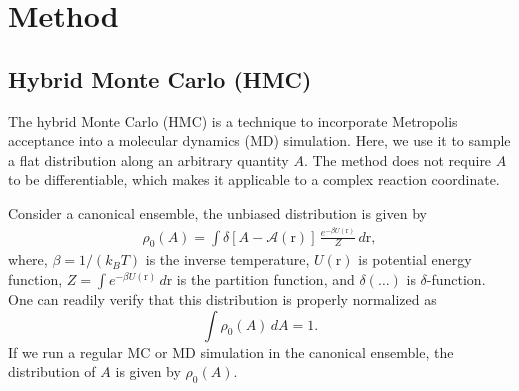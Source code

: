 \documentclass[notitlepage, preprint,superscriptaddress]{revtex4-1}
\begin{document}
\newcommand{\vct}[1]{\bm{\mathrm{#1}}}
\newcommand{\vx}{\vct{x}}
\newcommand{\vy}{\vct{y}}
\newcommand{\Z}{\mathcal{Z}}
\newcommand{\E}{\mathcal{E}}
\newcommand{\Ham}{\mathcal{H}}
\newcommand{\W}{\mathcal{W}}
\newcommand{\A}{\mathcal{A}}

\newcommand{\repl}[2]{{\color{gray} [#1] }{\color{blue} #2}}
\newcommand{\add}[1]{{\color{blue} #1}}
\newcommand{\del}[1]{{\color{gray} [#1]}}
\newcommand{\note}[1]{{\color{OliveGreen}\small [\textbf{Comment.} #1]}}

\newcommand{\hl}[1]{{\color{red} #1}}



\section{Method}

\subsection{Hybrid Monte Carlo (HMC)}



The hybrid Monte Carlo (HMC)
is a technique to incorporate Metropolis acceptance
into a molecular dynamics (MD) simulation.
%
Here, we use it to sample a flat distribution
along an arbitrary quantity $A$.
%
The method
does not require $A$ to be differentiable,
which makes it applicable to
a complex reaction coordinate.

Consider a canonical ensemble,
the unbiased distribution
is given by
\begin{align}
  \rho_0(A)
=
  \int
    \delta[A - \mathcal A(\vct{r})]
    \, \frac{ e^{-\beta U(\vct{r})} } { Z } \, d\vct{r},
\end{align}
where,
$\beta = 1/(k_B T)$ is the inverse temperature,
$U(\vct{r})$ is potential energy function,
$Z = \int e^{-\beta U(\vct{r})} \, d\vct{r}$ is the partition function,
and $\delta(\dots)$ is $\delta$-function.
%
One can readily verify that this distribution is properly normalized as
\[
  \int \rho_0(A) \, dA = 1.
\]
%
If we run a regular MC or MD simulation in the canonical ensemble,
the distribution of $A$ is given by $\rho_0(A)$.
\end{document}
